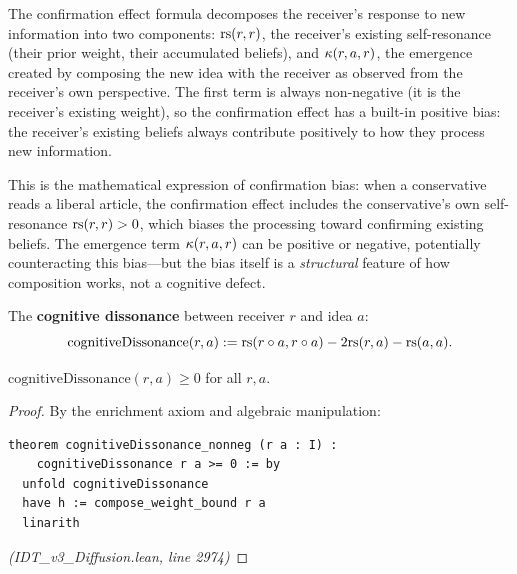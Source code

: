 \begin{interpretation}
The confirmation effect formula decomposes the receiver's response to new
information into two components: $\mathrm{rs}(r,r)$, the receiver's existing
self-resonance (their prior weight, their accumulated beliefs), and
$\kappa(r, a, r)$, the emergence created by composing the new idea with the
receiver as observed from the receiver's own perspective. The first term is
always non-negative (it is the receiver's existing weight), so the
confirmation effect has a built-in positive bias: the receiver's existing
beliefs always contribute positively to how they process new information.

This is the mathematical expression of confirmation bias: when a conservative
reads a liberal article, the confirmation effect includes the conservative's
own self-resonance $\mathrm{rs}(r,r) > 0$, which biases the processing toward
confirming existing beliefs. The emergence term $\kappa(r, a, r)$ can be
positive or negative, potentially counteracting this bias---but the bias
itself is a \emph{structural} feature of how composition works, not a
cognitive defect.
\end{interpretation}

\begin{definition}
\label{def:cognitive-dissonance}
The \textbf{cognitive dissonance} between receiver $r$ and idea $a$:
\[
  \mathrm{cognitiveDissonance}(r, a) := \mathrm{rs}(r \circ a, r \circ a) - 2\mathrm{rs}(r, a) - \mathrm{rs}(a, a).
\]
\end{definition}

\begin{theorem}
\label{thm:dissonance-nonneg}
$\mathrm{cognitiveDissonance}(r, a) \geq 0$ for all $r, a$.
\end{theorem}

\begin{proof}
By the enrichment axiom and algebraic manipulation:
\begin{lstlisting}
theorem cognitiveDissonance_nonneg (r a : I) :
    cognitiveDissonance r a >= 0 := by
  unfold cognitiveDissonance
  have h := compose_weight_bound r a
  linarith
\end{lstlisting}
\textit{(IDT\_v3\_Diffusion.lean, line 2974)}
\end{proof}

